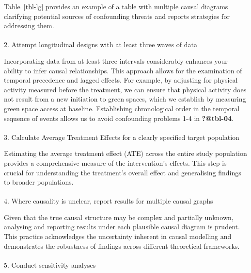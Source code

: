 \documentclass[
  single column]{article}
\makeatletter
\let\oldparagraph\paragraph
\renewcommand{\paragraph}{
    \@ifstar
      \xxxParagraphStar
      \xxxParagraphNoStar
  }
\newcommand{\xxxParagraphStar}[1]{\oldparagraph*{#1}\mbox{}}
\newcommand{\xxxParagraphNoStar}[1]{\oldparagraph{#1}\mbox{}}
\makeatother
\begin{document}
Table~\ref{tbl-lg} provides an example of a table with multiple causal
diagrams clarifying potential sources of confounding threats and reports
strategies for addressing them.

\paragraph{2. Attempt longitudinal designs with at least three waves of
data}\label{attempt-longitudinal-designs-with-at-least-three-waves-of-data}

Incorporating data from at least three intervals considerably enhances
your ability to infer causal relationships. This approach allows for the
examination of temporal precedence and lagged effects. For example, by
adjusting for physical activity measured before the treatment, we can
ensure that physical activity does not result from a new initiation to
green spaces, which we establish by measuring green space access at
baseline. Establishing chronological order in the temporal sequence of
events allows us to avoid confounding problems 1-4 in \textbf{?@tbl-04}.

\paragraph{3. Calculate Average Treatment Effects for a clearly
specified target
population}\label{calculate-average-treatment-effects-for-a-clearly-specified-target-population}

Estimating the average treatment effect (ATE) across the entire study
population provides a comprehensive measure of the intervention's
effects. This step is crucial for understanding the treatment's overall
effect and generalising findings to broader populations.

\paragraph{4. Where causality is unclear, report results for multiple
causal
graphs}\label{where-causality-is-unclear-report-results-for-multiple-causal-graphs}

Given that the true causal structure may be complex and partially
unknown, analysing and reporting results under each plausible causal
diagram is prudent. This practice acknowledges the uncertainty inherent
in causal modelling and demonstrates the robustness of findings across
different theoretical frameworks.

\paragraph{5. Conduct sensitivity
analyses}\label{conduct-sensitivity-analyses}
\end{document}
